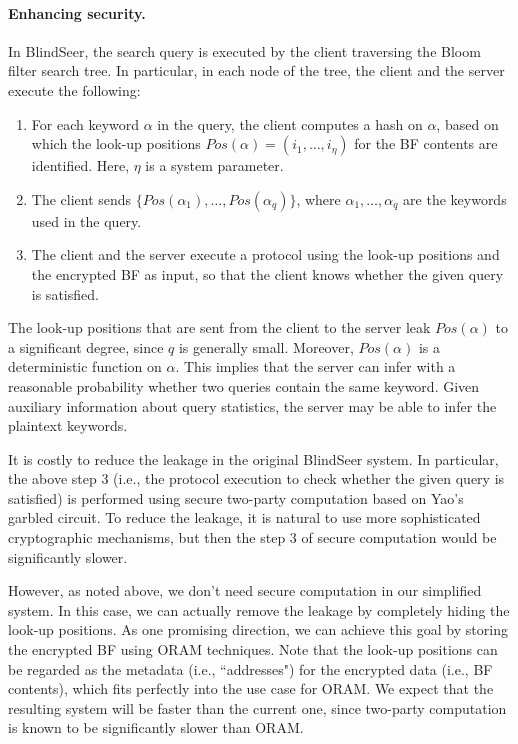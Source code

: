 \paragraph{Enhancing security.}
In BlindSeer, the search query is executed by the client traversing the Bloom filter
search tree. In particular, in each node of the tree, the client and the server
execute the following:
\begin{enumerate}\setlength\itemsep{0em}
\item For each keyword $\alpha$ in the query, the client computes a hash on
  $\alpha$, based on which the look-up positions $Pos(\alpha) = (i_1, \ldots,
    i_\eta)$ for the BF contents are identified. Here, $\eta$ is a system
    parameter. 

\item The client sends $\{Pos(\alpha_1), \ldots, Pos(\alpha_q)\}$,
  where $\alpha_1,\ldots,\alpha_q$ are the keywords used in the query.

\item The client and the server execute a protocol using the look-up positions
  and the encrypted BF as input, so that the client knows whether the given
query is satisfied. 
\end{enumerate}

The look-up positions that are sent from the client to the server leak
$Pos(\alpha)$ to a significant degree, since $q$ is generally small.
Moreover, $Pos(\alpha)$ is a deterministic function on $\alpha$.
This implies that the server can infer with a reasonable probability whether
two queries contain the same keyword.
Given  auxiliary information about query statistics, the
server may be able to infer the plaintext keywords.


It is costly to reduce the leakage in the original BlindSeer system. In
particular, the above step 3 (i.e., the protocol execution to check whether the
given query is satisfied) is performed using secure two-party computation based
on Yao's garbled circuit. To reduce the leakage, it is natural to use more
sophisticated cryptographic mechanisms, but then the step 3 of secure
computation would be significantly slower. 

However, as noted above, we don't need secure computation in our simplified
system. In this case, we can actually remove the leakage by completely hiding
the look-up positions. As one promising direction, we can achieve this goal by
storing the encrypted BF using ORAM techniques. Note that the look-up positions
can be regarded as the metadata (i.e., ``addresses") for the encrypted data
(i.e., BF contents), which fits perfectly into the use case for ORAM.
%
We expect that the resulting system will be faster than the current one,
since two-party computation is
known to be significantly slower than ORAM. 
